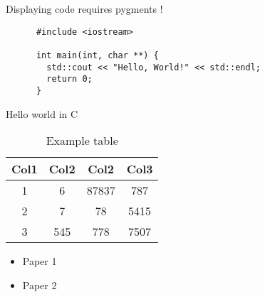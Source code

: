 
\begin{subsectionslide}[containsverbatim]
  Displaying code requires pygments !

  \begin{listing}[H]
    \begin{verbatim}
      #include <iostream>

      int main(int, char **) {
        std::cout << "Hello, World!" << std::endl;
        return 0;
      }
    \end{verbatim}
    \caption{Hello world in C}
  \end{listing}

\end{subsectionslide}


\begin{subsectionslide}

  \begin{center}
    \begin{table}
      \begin{tabular}{|c|c|c|c|}
       \hline
       \rowcolor{tableFirstRowColor} Col1 & Col2 & Col2 & Col3 \\ [0.5ex]
       \hline
       \cellcolor{tableFirstColColor} 1 & 6 & 87837 & 787 \\
       \hline
       \cellcolor{tableFirstColColor} 2 & 7 & 78 & 5415 \\
       \hline
       \cellcolor{tableFirstColColor} 3 & 545 & 778 & 7507 \\
       \hline
      \end{tabular}
      \caption{Example table}
    \end{table}
  \end{center}

\end{subsectionslide}


\begin{subsectionslide}
  \begin{itemize}
    \item Paper 1 \cite{blattner2017model}
    \item Paper 2 \cite{bardakoff2020hedgehog}
  \end{itemize}
\end{subsectionslide}
